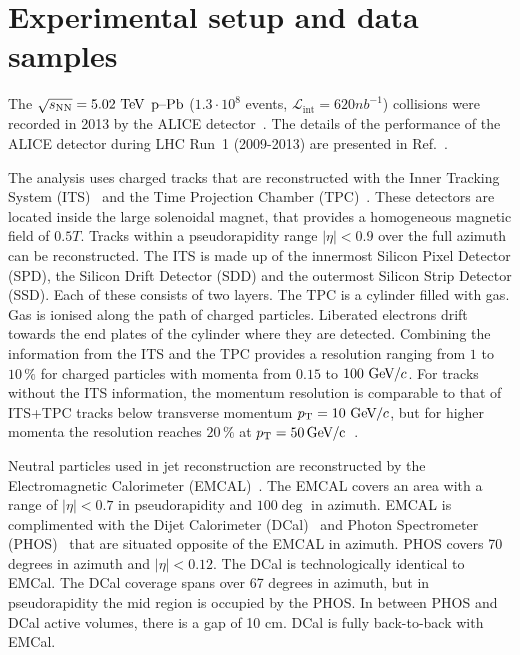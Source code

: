 \section{Experimental setup and data samples}
\label{sec:experimentaldetails}
The $\sqrt{s_{\mathrm{NN}}} = 5.02~\mathrm{TeV}$ $\mbox{p--Pb}$ ($1.3 \cdot 10^{8}$ events, $\mathcal{L}_{\mathrm{int}} = \unit{620}{nb^{-1}}$) collisions were recorded in 2013 by the ALICE detector~\cite{aliceDetector}. The details of the performance of the ALICE detector during LHC Run~1 (2009-2013) are presented in Ref.~\cite{alicePerformance}.

The analysis uses charged tracks that are reconstructed with the Inner Tracking System (ITS)~\cite{aliceITS} and the Time Projection Chamber (TPC)~\cite{aliceTPC}. These detectors are located inside the large solenoidal magnet, that provides a homogeneous magnetic field of $\unit{0.5}{T}$. Tracks within a pseudorapidity range $|\eta| < 0.9$ over the full azimuth can be reconstructed. The ITS is made up of the innermost Silicon Pixel Detector (SPD), the Silicon Drift Detector (SDD) and the outermost Silicon Strip Detector (SSD). Each of these consists of two layers. The TPC is a cylinder filled with gas. Gas is ionised along the path of charged particles. Liberated electrons drift towards the end plates of the cylinder where they are detected. Combining the information from the ITS and the TPC provides a resolution ranging from $1$ to $10\,\%$ for charged particles with momenta from $0.15$ to $100~\mathrm{GeV}\kern-0.05em/\kern-0.02em c$. For tracks without the ITS information, the momentum resolution is comparable to that of ITS+TPC tracks below transverse momentum $p_{\rm T} = 10~\mathrm{GeV}\kern-0.05em/\kern-0.02em c$, but for higher momenta the resolution reaches $20\,\%$ at $\pt{} = \unit[50]{\GeVc}$~\cite{alicePerformance,aliceBackgroundFluctuation}. 

Neutral particles used in jet reconstruction are reconstructed by the Electromagnetic Calorimeter (EMCAL)~\cite{Cortese:2008zza}. The EMCAL covers an area with a range of $|\eta| < 0.7$  in pseudorapidity and $ 100 \deg $ in azimuth. EMCAL is complimented with the Dijet Calorimeter (DCal)~\cite{DCAL} and Photon Spectrometer (PHOS)~\cite{PHOS} that are situated opposite of the EMCAL in azimuth. PHOS covers 70 degrees in azimuth and $\left| \eta \right| < 0.12$. The DCal is technologically identical to EMCal. The DCal coverage spans over 67 degrees in azimuth, but in pseudorapidity the mid region is occupied by the PHOS. In between PHOS and DCal active volumes, there is a gap of 10 cm. DCal is fully back-to-back with EMCal.

